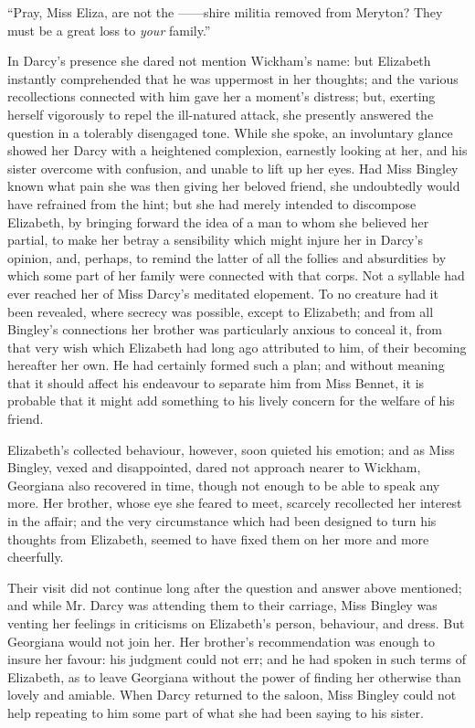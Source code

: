 \documentclass[12pt]{book}
\begin{document}
``Pray, Miss Eliza, are not the ------shire militia removed from Meryton? They must be a great loss to \textit{your} family.''

In Darcy's presence she dared not mention Wickham's name: but Elizabeth instantly comprehended that he was uppermost in her thoughts; and the various recollections connected with him gave her a moment's distress; but, exerting herself vigorously to repel the ill-natured attack, she presently answered the question in a tolerably disengaged tone. While she spoke, an involuntary glance showed her Darcy with a heightened complexion, earnestly looking at her, and his sister overcome with confusion, and unable to lift up her eyes. Had Miss Bingley known what pain she was then giving her beloved friend, she undoubtedly would have refrained from the hint; but she had merely intended to discompose Elizabeth, by bringing forward the idea of a man to whom she believed her partial, to make her betray a sensibility which might injure her in Darcy's opinion, and, perhaps, to remind the latter of all the follies and absurdities by which some part of her family were connected with that corps. Not a syllable had ever reached her of Miss Darcy's meditated elopement. To no creature had it been revealed, where secrecy was possible, except to Elizabeth; and from all Bingley's connections her brother was particularly anxious to conceal it, from that very wish which Elizabeth had long ago attributed to him, of their becoming hereafter her own. He had certainly formed such a plan; and without meaning that it should affect his endeavour to separate him from Miss Bennet, it is probable that it might add something to his lively concern for the welfare of his friend.

Elizabeth's collected behaviour, however, soon quieted his emotion; and as Miss Bingley, vexed and disappointed, dared not approach nearer to Wickham, Georgiana also recovered in time, though not enough to be able to speak any more. Her brother, whose eye she feared to meet, scarcely recollected her interest in the affair; and the very circumstance which had been designed to turn his thoughts from Elizabeth, seemed to have fixed them on her more and more cheerfully.

Their visit did not continue long after the question and answer above mentioned; and while Mr. Darcy was attending them to their carriage, Miss Bingley was venting her feelings in criticisms on Elizabeth's person, behaviour, and dress. But Georgiana would not join her. Her brother's recommendation was enough to insure her favour: his judgment could not err; and he had spoken in such terms of Elizabeth, as to leave Georgiana without the power of finding her otherwise than lovely and amiable. When Darcy returned to the saloon, Miss Bingley could not help repeating to him some part of what she had been saying to his sister.
\end{document}
